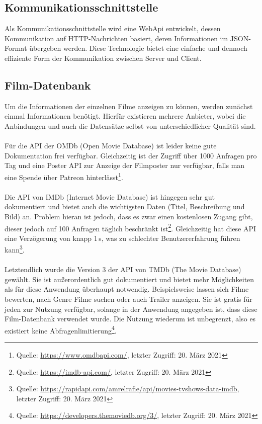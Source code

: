 \subsection{Kommunikationsschnittstelle}
Als Kommunikationsschnittstelle wird eine WebApi entwickelt, dessen Kommunikation auf HTTP-Nachrichten basiert, deren Informationen im JSON-Format übergeben werden. Diese Technologie bietet eine einfache und dennoch effiziente Form der Kommunikation zwischen Server und Client.

\subsection{Film-Datenbank}
\label{sec:filmdatenbank}
Um die Informationen der einzelnen Filme anzeigen zu können, werden zunächst einmal Informationen benötigt.
Hierfür existieren mehrere Anbieter, wobei die Anbindungen und auch die Datensätze selbst von unterschiedlicher Qualität sind.\\
\\
Für die API der OMDb (Open Movie Database) ist leider keine gute Dokumentation frei verfügbar.
Gleichzeitig ist der Zugriff über 1000 Anfragen pro Tag und eine Poster API zur Anzeige der Filmposter nur verfügbar, falls man eine Spende über Patreon hinterlässt\footnote{Quelle: \url{https://www.omdbapi.com/}, letzter Zugriff: 20. März 2021}.\\
\\
Die API von IMDb (Internet Movie Database) ist hingegen sehr gut dokumentiert und bietet auch die wichtigsten Daten (Titel, Beschreibung und Bild) an.
Problem hieran ist jedoch, dass es zwar einen kostenlosen Zugang gibt, dieser jedoch auf 100 Anfragen täglich beschränkt ist\footnote{Quelle: \url{https://imdb-api.com/}, letzter Zugriff: 20. März 2021}. 
Gleichzeitig hat diese API eine Verzögerung von knapp 1\,s, was zu schlechter Benutzererfahrung führen kann\footnote{Quelle: \url{https://rapidapi.com/amrelrafie/api/movies-tvshows-data-imdb}, letzter Zugriff: 20. März 2021}.\\
\\
Letztendlich wurde die Version 3 der API von TMDb (The Movie Database) gewählt.
Sie ist außerordentlich gut dokumentiert und bietet mehr Möglichkeiten als für diese Anwendung überhaupt notwendig.
Beispielsweise lassen sich Filme bewerten, nach Genre Filme suchen oder auch Trailer anzeigen.
Sie ist gratis für jeden zur Nutzung verfügbar, solange in der Anwendung angegeben ist, dass diese Film-Datenbank verwendet wurde.
Die Nutzung wiederum ist unbegrenzt, also es existiert keine Abfragenlimitierung\footnote{Quelle: \url{https://developers.themoviedb.org/3/}, letzter Zugriff: 20. März 2021}.
